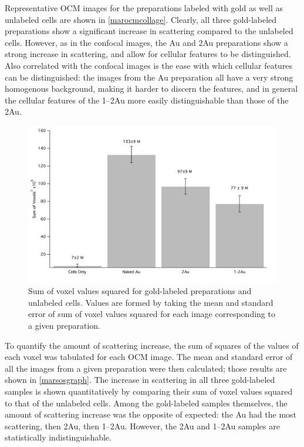 Representative OCM images for the preparations labeled with gold as well as unlabeled cells are shown in \autoref{marocmcollage}. Clearly, all three gold-labeled preparations show a significant increase in scattering compared to the unlabeled cells. However, as in the confocal images, the Au and 2Au preparations show a strong increase in scattering, and allow for cellular features to be distinguished. Also correlated with the confocal images is the ease with which cellular features can be distinguished: the images from the Au preparation all have a very strong homogenous background, making it harder to discern the features, and in general the cellular features of the 1--2Au more easily distinguishable than those of the 2Au.

\begin{figure}[htbp]
\centering
\includegraphics[keepaspectratio,width=\textwidth,height=0.75\textheight]{6marSOSgraph.pdf}
\caption{Sum of voxel values squared for gold-labeled preparations and unlabeled cells. Values are formed by taking the mean and standard error of sum of voxel values squared for each image corresponding to a given preparation.}
\label{marsosgraph}
\end{figure}



To quantify the amount of scattering increase, the sum of squares of the values of each voxel was tabulated for each OCM image. The mean and standard error of all the images from a given preparation were then calculated; those results are shown in \autoref{marsosgraph}. The increase in scattering in all three gold-labeled samples is shown quantitatively by comparing their sum of voxel values squared to that of the unlabeled cells. Among the gold-labeled samples themselves, the amount of scattering increase was the opposite of expected: the Au had the most scattering, then 2Au, then 1--2Au. However, the 2Au and 1--2Au samples are statistically indistinguishable.

